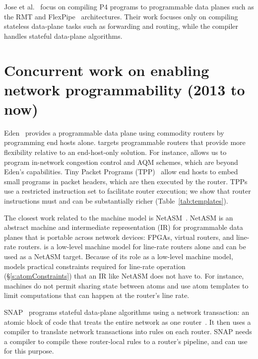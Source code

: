 Jose et al.~\cite{lavanya_compiler} focus on compiling P4 programs to
programmable data planes such as the RMT and FlexPipe~\cite{flexpipe} architectures. Their work
focuses only on compiling stateless data-plane tasks such as forwarding and
routing, while the \pktlanguage compiler handles stateful data-plane
algorithms.

\section{Concurrent work on enabling network programmability (2013 to now)}
Eden~\cite{eden} provides a programmable data plane using commodity routers by
programming end hosts alone. \pktlanguage targets programmable routers that
provide more flexibility relative to an end-host-only solution. For instance,
\pktlanguage allows us to program in-network congestion control and AQM
schemes, which are beyond Eden's capabilities.  Tiny Packet Programs
(TPP)~\cite{tpp} allow end hosts to embed small programs in packet headers,
which are then executed by the router. TPPs use a restricted instruction set to
facilitate router execution; we show that router instructions must and can be
substantially richer (Table~\ref{tab:templates}).

The closest work related to the \absmachine machine model is
NetASM~\cite{netasm}. NetASM is an abstract machine and intermediate
representation (IR) for programmable data planes that is portable across
network devices: FPGAs, virtual routers, and line-rate routers.  \absmachine
is a low-level machine model for line-rate routers alone and can be used as a
NetASM target. Because of its role as a low-level machine model, \absmachine
models practical constraints required for line-rate operation
(\S\ref{s:atomConstraints}) that an IR like NetASM does not have to. For
instance, \absmachine machines do not permit sharing state between atoms and use
atom templates to limit computations that can happen at the router's line rate.

SNAP~\cite{snap} programs stateful data-plane algorithms using a network
transaction: an atomic block of code that treats the entire network as one
router~\cite{onebigswitch}. It then uses a compiler to translate network
transactions into rules on each router. SNAP needs a compiler to compile these
router-local rules to a router's pipeline, and can use \pktlanguage for this
purpose.

